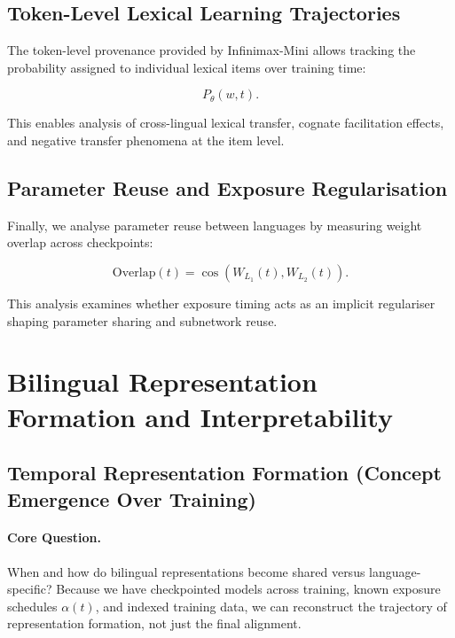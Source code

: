 \subsection{Token-Level Lexical Learning Trajectories}

The token-level provenance provided by Infinimax-Mini allows tracking the probability assigned to individual lexical items over training time:

\begin{equation}
P_\theta(w,t).
\end{equation}

This enables analysis of cross-lingual lexical transfer, cognate facilitation effects, and negative transfer phenomena at the item level.

\subsection{Parameter Reuse and Exposure Regularisation}

Finally, we analyse parameter reuse between languages by measuring weight overlap across checkpoints:

\begin{equation}
\text{Overlap}(t) = \cos(W_{L_1}(t), W_{L_2}(t)).
\end{equation}

This analysis examines whether exposure timing acts as an implicit regulariser shaping parameter sharing and subnetwork reuse.


\section{Bilingual Representation Formation and Interpretability}

\subsection{Temporal Representation Formation (Concept Emergence Over Training)}

\paragraph{Core Question.} When and how do bilingual representations become shared versus language-specific?  
Because we have checkpointed models across training, known exposure schedules $\alpha(t)$, and indexed training data, we can reconstruct the trajectory of representation formation, not just the final alignment.

